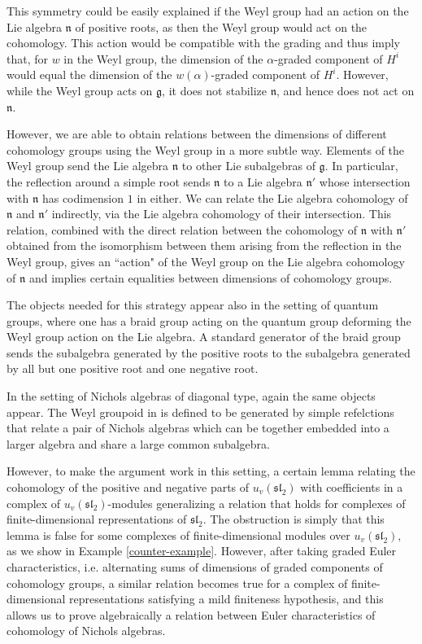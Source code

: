 \documentclass[11pt,letterpaper]{article}
\theoremstyle{definition}
\theoremstyle{remark}
\numberwithin{equation}{section}
\theoremstyle{dotless}
\begin{document}
This symmetry could be easily explained if the Weyl group had an action on the Lie algebra $\mathfrak n$ of positive roots, as then the Weyl group would act on the cohomology. This action would be compatible with the grading and thus imply that, for $w$ in the Weyl group, the dimension of the $\alpha$-graded component of $H^i$ would equal the dimension of the $w(\alpha)$-graded component of $H^i$. However, while the Weyl group acts on $\mathfrak g$, it does not stabilize $\mathfrak n$, and hence does not act on $\mathfrak n$.

However, we are able to obtain relations between the dimensions of different cohomology groups using the Weyl group in a more subtle way. Elements of the Weyl group send the Lie algebra $\mathfrak n$ to other Lie subalgebras of $\mathfrak g$. In particular, the reflection around a simple root sends $\mathfrak n$ to a Lie algebra $\mathfrak n'$ whose intersection with $\mathfrak n$ has codimension $1$ in either. We can relate the Lie algebra cohomology of $\mathfrak n$ and $\mathfrak n'$ indirectly, via the Lie algebra cohomology of their intersection. This relation, combined with the direct relation between the cohomology of $\mathfrak n$ with $\mathfrak n'$ obtained from the isomorphism between them arising from the reflection in the Weyl group, gives an ``action" of the Weyl group on the Lie algebra cohomology of $\mathfrak n$ and implies certain equalities between dimensions of cohomology groups. 

The objects needed for this strategy appear also in the setting of quantum groups, where one has a braid group acting on the quantum group deforming the Weyl group action on the Lie algebra. A standard generator of the braid group sends the subalgebra generated by the positive roots to the subalgebra generated by all but one positive root and one negative root. 

In the setting of Nichols algebras of diagonal type, again the same objects appear. The Weyl groupoid in \cite{HeckenbergerWeyl} is defined to be generated by simple refelctions that relate a pair of Nichols algebras which can be together embedded into a larger algebra and share a large common subalgebra.

However, to make the argument work in this setting, a certain lemma relating the cohomology of the positive and negative parts of $u_v (\mathfrak{sl}_2)$ with coefficients in a complex of $u_v (\mathfrak{sl}_2)$-modules generalizing a relation that holds for complexes of finite-dimensional representations of $\mathfrak{sl}_2$. The obstruction is simply that this lemma is false for some complexes of finite-dimensional modules over $u_v (\mathfrak{sl}_2),$ as we show in Example \ref{counter-example}.  However, after taking graded Euler characteristics, i.e. alternating sums of dimensions of graded components of cohomology groups, a similar relation becomes true for a complex of finite-dimensional representations satisfying a mild finiteness hypothesis, and this allows us to prove algebraically a relation between Euler characteristics of cohomology of Nichols algebras.
\end{document}
